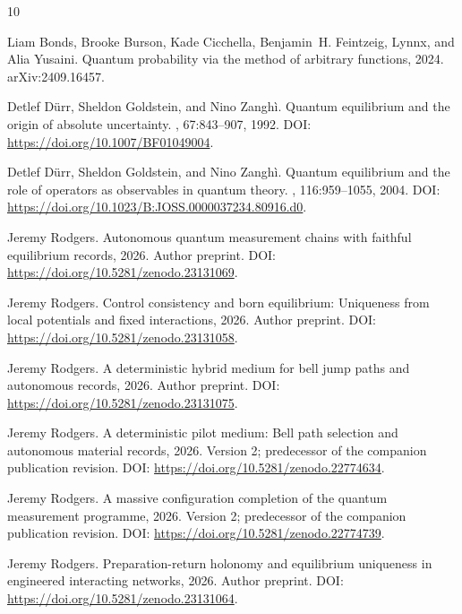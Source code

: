 \documentclass[11pt]{article}
\theoremstyle{definition}\newtheorem{definition}[theorem]{Definition}
\theoremstyle{remark}\newtheorem{remark}[theorem]{Remark}
\begin{document}
{\small\nocite{PortfolioControl,PortfolioReturn,PortfolioEquilibrium,PortfolioPilot,RodgersMonograph,RodgersPilot,RodgersMassive}
\begin{thebibliography}{10}

Liam Bonds, Brooke Burson, Kade Cicchella, Benjamin~H. Feintzeig, {Lynnx}, and
  Alia Yusaini.
\newblock Quantum probability via the method of arbitrary functions, 2024.
\newblock arXiv:2409.16457.

Detlef D{\"u}rr, Sheldon Goldstein, and Nino Zangh{\`i}.
\newblock Quantum equilibrium and the origin of absolute uncertainty.
, 67:843--907, 1992.
\newblock DOI: \url{https://doi.org/10.1007/BF01049004}.

Detlef D{\"u}rr, Sheldon Goldstein, and Nino Zangh{\`i}.
\newblock Quantum equilibrium and the role of operators as observables in
  quantum theory.
, 116:959--1055, 2004.
\newblock DOI: \url{https://doi.org/10.1023/B:JOSS.0000037234.80916.d0}.

Jeremy Rodgers.
\newblock Autonomous quantum measurement chains with faithful equilibrium
  records, 2026.
\newblock Author preprint. DOI: \url{https://doi.org/10.5281/zenodo.23131069}.

Jeremy Rodgers.
\newblock Control consistency and born equilibrium: Uniqueness from local
  potentials and fixed interactions, 2026.
\newblock Author preprint. DOI: \url{https://doi.org/10.5281/zenodo.23131058}.

Jeremy Rodgers.
\newblock A deterministic hybrid medium for bell jump paths and autonomous
  records, 2026.
\newblock Author preprint. DOI: \url{https://doi.org/10.5281/zenodo.23131075}.

Jeremy Rodgers.
\newblock A deterministic pilot medium: Bell path selection and autonomous
  material records, 2026.
\newblock Version 2; predecessor of the companion publication revision. DOI:
  \url{https://doi.org/10.5281/zenodo.22774634}.

Jeremy Rodgers.
\newblock A massive configuration completion of the quantum measurement
  programme, 2026.
\newblock Version 2; predecessor of the companion publication revision. DOI:
  \url{https://doi.org/10.5281/zenodo.22774739}.

Jeremy Rodgers.
\newblock Preparation-return holonomy and equilibrium uniqueness in engineered
  interacting networks, 2026.
\newblock Author preprint. DOI: \url{https://doi.org/10.5281/zenodo.23131064}.


\end{thebibliography}}
\end{document}
